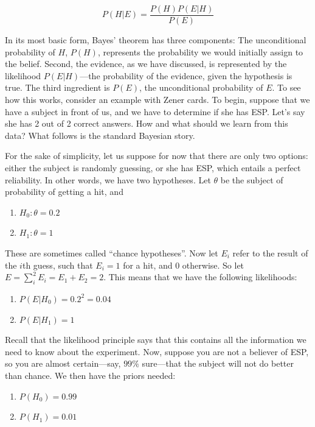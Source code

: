 \[P(H|E) = \frac{P(H)P(E|H)}{P(E)}\]

In its most basic form, Bayes' theorem has three components: The
unconditional probability of \(H\), \(P(H)\), represents the probability
we would initially assign to the belief. Second, the evidence, as we have
discussed, is represented by the likelihood \(P(E|H)\)---the probability
of the evidence, given the hypothesis is true. The third ingredient is
\(P(E)\), the unconditional probability of \(E\). To see how this works,
consider an example with Zener cards. To begin, suppose that we have a
subject in front of us, and we have to determine if she has ESP. Let's say
she has 2 out of 2 correct answers. How and what should we learn from this data?
What follows is the standard Bayesian story.

For the sake of simplicity, let us suppose for now that there are only
two options: either the subject is randomly guessing, or she has ESP,
which entails a perfect reliability. In other words, we have two
hypotheses. Let \(\theta\) be the subject of probability of getting a
hit, and

\begin{enumerate}
\def\labelenumi{\arabic{enumi}.}
\tightlist
\item
  \(H_0: \theta = 0.2\)
\item
  \(H_1: \theta = 1\)
\end{enumerate}

These are sometimes called ``chance hypotheses''. Now let \(E_i\) refer
to the result of the \(i\)th guess, such that $E_i=1$ for a hit, and
\(0\) otherwise. So let \(E = \sum_i^2 E_i = E_1 + E_2 = 2\). This means
that we have the following likelihoods:

\begin{enumerate}
\def\labelenumi{\arabic{enumi}.}
\setcounter{enumi}{2}
\tightlist
\item
  \(P(E|H_0) = 0.2^2=0.04\)
\item
  \(P(E|H_1) = 1\)
\end{enumerate}

Recall that the likelihood principle says that this contains all the
information we need to know about the experiment. Now, suppose you are
not a believer of ESP, so you are almost certain---say, \(99\%\)
sure---that the subject will not do better than chance. We then have the
priors needed:

\begin{enumerate}
\def\labelenumi{\arabic{enumi}.}
\setcounter{enumi}{4}
\tightlist
\item
  \(P(H_0) = 0.99\)
\item
  \(P(H_1) = 0.01\)
\end{enumerate}


